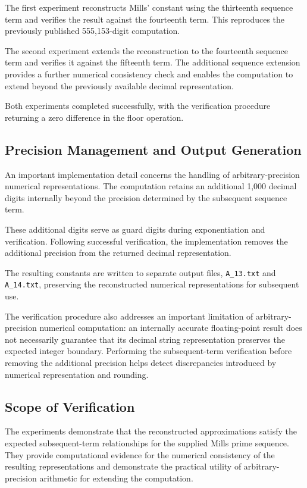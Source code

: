 \documentclass{article}
\begin{document}
The first experiment reconstructs Mills' constant using the thirteenth sequence term and verifies the result against the fourteenth term. This reproduces the previously published 555,153-digit computation.

The second experiment extends the reconstruction to the fourteenth sequence term and verifies it against the fifteenth term. The additional sequence extension provides a further numerical consistency check and enables the computation to extend beyond the previously available decimal representation.

Both experiments completed successfully, with the verification procedure returning a zero difference in the floor operation.

\subsection{Precision Management and Output Generation}

An important implementation detail concerns the handling of arbitrary-precision numerical representations. The computation retains an additional 1,000 decimal digits internally beyond the precision determined by the subsequent sequence term.

These additional digits serve as guard digits during exponentiation and verification. Following successful verification, the implementation removes the additional precision from the returned decimal representation.

The resulting constants are written to separate output files, \texttt{A\_13.txt} and \texttt{A\_14.txt}, preserving the reconstructed numerical representations for subsequent use.

The verification procedure also addresses an important limitation of arbitrary-precision numerical computation: an internally accurate floating-point result does not necessarily guarantee that its decimal string representation preserves the expected integer boundary. Performing the subsequent-term verification before removing the additional precision helps detect discrepancies introduced by numerical representation and rounding.

\subsection{Scope of Verification}

The experiments demonstrate that the reconstructed approximations satisfy the expected subsequent-term relationships for the supplied Mills prime sequence. They provide computational evidence for the numerical consistency of the resulting representations and demonstrate the practical utility of arbitrary-precision arithmetic for extending the computation.
\end{document}
